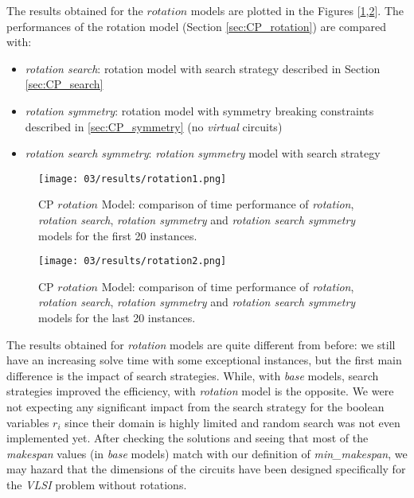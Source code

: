 The results obtained for the \(rotation\) models are plotted in the Figures [\ref{fig:CP_results_rotation1},\ref{fig:CP_results_rotation2}].
The performances of the rotation model (Section \ref{sec:CP_rotation}) are compared with:
\begin{itemize}
  \item \textit{rotation search}: rotation model with search strategy described in Section \ref{sec:CP_search}
  \item \textit{rotation symmetry}: rotation model with symmetry breaking constraints described in \ref{sec:CP_symmetry} (no \textit{virtual} circuits)
  \item \textit{rotation search symmetry}: \textit{rotation symmetry} model with search strategy
\end{itemize}

\begin{figure}[H]
  \centering
  \texttt{[image: 03/results/rotation1.png]}
  \caption{
    CP \(rotation\) Model: comparison of time performance of \textit{rotation}, \textit{rotation search}, \textit{rotation symmetry} and \textit{rotation search symmetry} models
    for the first 20 instances.
  }
  \label{fig:CP_results_rotation1}
\end{figure}
\begin{figure}[H]
  \centering
  \texttt{[image: 03/results/rotation2.png]}
  \caption{
    CP \(rotation\) Model: comparison of time performance of \textit{rotation}, \textit{rotation search}, \textit{rotation symmetry} and \textit{rotation search symmetry} models
    for the last 20 instances.
  }
  \label{fig:CP_results_rotation2}
\end{figure}

The results obtained for \textit{rotation} models are quite different from before: we still have an increasing solve 
time with some exceptional instances, but the first main difference is the impact of search strategies. 
While, with \textit{base} models, search strategies improved the efficiency, with \textit{rotation} model is the opposite.
We were not expecting any significant impact from the search strategy for the boolean variables \(r_i\) since their domain 
is highly limited and random search was not even implemented yet.
After checking the solutions and seeing that most of the \textit{makespan} values (in \textit{base} models) match with our 
definition of \textit{min\_makespan}, we may hazard that the dimensions of the circuits have been designed specifically for 
the \textit{VLSI} problem without rotations.\\

